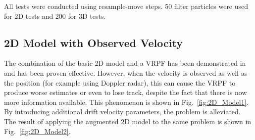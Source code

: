 \documentclass[conference]{IEEEtran}
\begin{document}
All tests were conducted using resample-move steps. 50 filter particles were used for 2D tests and 200 for 3D tests.



\subsection{2D Model with Observed Velocity}

The combination of the basic 2D model and a VRPF has been demonstrated in \cite{Godsill2007} and has been proven effective. However, when the velocity is observed as well as the position (for example using Doppler radar), this can cause the VRPF to produce worse estimates or even to lose track, despite the fact that there is now more information available. This phenomenon is shown in Fig.~\ref{fig:2D_Model1}. By introducing additional drift velocity parameters, the problem is alleviated. The result of applying the augmented 2D model to the same problem is shown in Fig.~\ref{fig:2D_Model2}.
\end{document}
